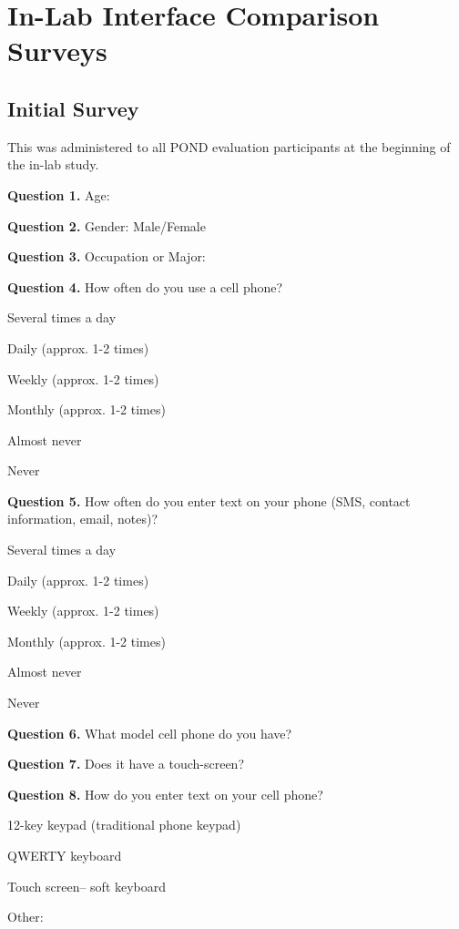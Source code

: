 \chapter{In-Lab Interface Comparison Surveys}
\label{cha:app_cont2_inlab_surveys}

\section{Initial Survey}
This was administered to all POND evaluation participants at the beginning of the in-lab study. 

\noindent\textbf{Question 1.}
Age: 


\noindent\textbf{Question 2.}
Gender: Male/Female

\noindent\textbf{Question 3.}
Occupation or Major: 

\noindent\textbf{Question 4.}
How often do you use a cell phone?
\begin{itemize*}
\item	Several times a day
\item	Daily (approx. 1-2 times)
\item	Weekly (approx. 1-2 times)
\item	Monthly (approx. 1-2 times)
\item	Almost never
\item	Never
\end{itemize*}

\noindent\textbf{Question 5.}
How often do you enter text on your phone (SMS, contact information, email, notes)?
\begin{itemize*}
\item	Several times a day
\item		Daily (approx. 1-2 times)
\item		Weekly (approx. 1-2 times)
\item		Monthly (approx. 1-2 times)
\item		Almost never
\item		Never
\end{itemize*}

\noindent\textbf{Question 6.}
What model cell phone do you have? 

\noindent\textbf{Question 7.}
Does it have a touch-screen?


\noindent\textbf{Question 8.}
How do you enter text on your cell phone?

\begin{itemize*}
\item	12-key keypad (traditional phone keypad)
\item	QWERTY keyboard
\item	Touch screen-- soft keyboard
\item	Other:  
\end{itemize*}

